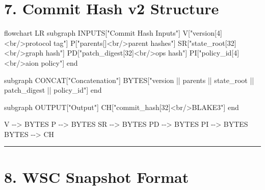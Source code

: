 \documentclass[
]{book}
\newenvironment{Shaded}{}{}
\newcommand{\NormalTok}[1]{#1}
\begin{document}
\section{7. Commit Hash v2 Structure}\label{commit-hash-v2-structure}

\begin{Shaded}
\begin{Highlighting}[]
\NormalTok{flowchart LR}
\NormalTok{    subgraph INPUTS["Commit Hash Inputs"]}
\NormalTok{        V["version[4]\textless{}br/\textgreater{}protocol tag"]}
\NormalTok{        P["parents[]\textless{}br/\textgreater{}parent hashes"]}
\NormalTok{        SR["state\_root[32]\textless{}br/\textgreater{}graph hash"]}
\NormalTok{        PD["patch\_digest[32]\textless{}br/\textgreater{}ops hash"]}
\NormalTok{        PI["policy\_id[4]\textless{}br/\textgreater{}aion policy"]}
\NormalTok{    end}

\NormalTok{    subgraph CONCAT["Concatenation"]}
\NormalTok{        BYTES["version || parents || state\_root || patch\_digest || policy\_id"]}
\NormalTok{    end}

\NormalTok{    subgraph OUTPUT["Output"]}
\NormalTok{        CH["commit\_hash[32]\textless{}br/\textgreater{}BLAKE3"]}
\NormalTok{    end}

\NormalTok{    V {-}{-}\textgreater{} BYTES}
\NormalTok{    P {-}{-}\textgreater{} BYTES}
\NormalTok{    SR {-}{-}\textgreater{} BYTES}
\NormalTok{    PD {-}{-}\textgreater{} BYTES}
\NormalTok{    PI {-}{-}\textgreater{} BYTES}
\NormalTok{    BYTES {-}{-}\textgreater{} CH}
\end{Highlighting}
\end{Shaded}

\begin{center}\rule{0.5\linewidth}{0.5pt}\end{center}

\section{8. WSC Snapshot Format}\label{wsc-snapshot-format}
\end{document}
